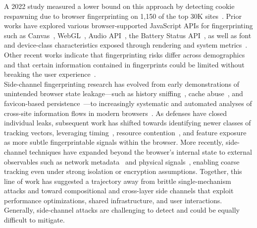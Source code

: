 %
A 2022 study measured a lower bound on this approach by detecting cookie respawning due to browser fingerprinting on 1,150 of the top 30K sites~\cite{fouadMyCookiePhoenix2022}.
%
Prior works have explored various browser-supported JavaScript APIs for fingerprinting such as Canvas~\cite{moweryPixelPerfectFingerprinting2012}, WebGL~\cite{caoCrossBrowserFingerprintingOS2017}, Audio API~\cite{englehardtOnlineTracking1millionsite2016}, the Battery Status API~\cite{olejnikLeakingBatteryPrivacy2016}, as well as font and device-class characteristics exposed through rendering and system metrics~\cite{fifield2015fingerprinting,bursztein2016picasso}.
%
Other recent works indicate that fingerprinting risks differ across demographics~\cite{berkeHowUniqueWhose2025} and that certain information contained in fingerprints could be limited without breaking the user experience~\cite{intumwayaseUARadarExploringImpact2023}.\\



% 
%
Side-channel fingerprinting research has evolved from early demonstrations of unintended browser state leakage—such as history sniffing~\cite{weinbergStillKnowWhat2011}, cache abuse~\cite{shusterman2021prime+}, and favicon-based persistence~\cite{solomosTalesFaviconsCaches2021}—to increasingly systematic and automated analyses of cross-site information flows in modern browsers~\cite{knittelXSinatorcomFormalModel2021}. 
%
As defenses have closed individual leaks, subsequent work has shifted towards identifying newer classes of tracking vectors, leveraging timing~\cite{jinTimingBasedBrowsingPrivacy2022}, resource contention~\cite{snyderPoolPartyExploitingBrowser2023}, and feature exposure~\cite{aliNavigatingMurkyWaters2023} as more subtle fingerprintable signals within the browser. 
%
More recently, side-channel techniques have expanded beyond the browser’s internal state to external observables such as network metadata~\cite{leeNettrackGenericWeb2023} and physical signals~\cite{jeonImListeningYour2018}, enabling coarse tracking even under strong isolation or encryption assumptions. 
%
Together, this line of work has suggested a trajectory away from brittle single-mechanism attacks and toward compositional and cross-layer side channels that exploit performance optimizations, shared infrastructure, and user interactions. 
%
Generally, side-channel attacks are challenging to detect and could be equally difficult to mitigate.

